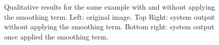 \begin{frame}
\begin{figure}[Htbp]

\caption{\scriptsize Qualitative results for the same example with and without applying the smoothing term. Left: original image. Top Right: system output without applying the smoothing term. Bottom right: system output once applied the smoothing term.}
\end{figure}
\end{frame}

